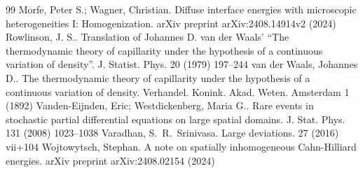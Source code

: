 \documentclass[10pt,a4paper]{amsart}
\begin{document}
\begin{thebibliography}{99}
 Morfe, Peter S.; Wagner, Christian. Diffuse interface energies with microscopic heterogeneities {I}: Homogenization. arXiv preprint arXiv:2408.14914v2 (2024)
 Rowlinson, J. S.. Translation of {J}ohannes {D}. van der {W}aals' ``{T}he thermodynamic theory of capillarity under the hypothesis of a continuous variation of density''. J. Statist. Phys. 20 (1979) 197--244
 van der Waals, Johannes D.. The thermodynamic theory of capillarity under the hypothesis of a continuous variation of density. Verhandel. Konink. Akad. Weten. Amsterdam 1 (1892)
 Vanden-Eijnden, Eric; Westdickenberg, Maria G.. Rare events in stochastic partial differential equations on large spatial domains. J. Stat. Phys. 131 (2008) 1023--1038
 Varadhan, S.~R.~Srinivasa. Large deviations. 27 (2016) vii+104
 Wojtowytsch, Stephan. A note on spatially inhomogeneous Cahn-Hilliard energies. arXiv preprint arXiv:2408.02154 (2024)
\end{thebibliography}
\end{document}
